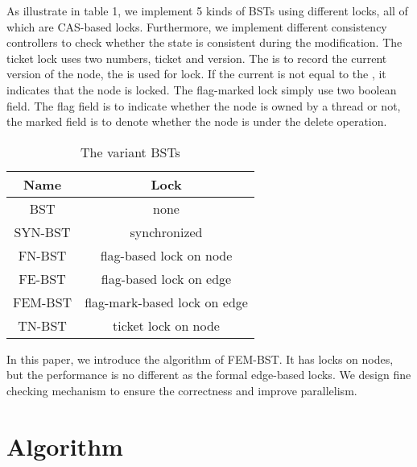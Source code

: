 \documentclass{article}
\begin{document}
As illustrate in table 1, we implement 5 kinds of BSTs using different locks, all of which are CAS-based locks. Furthermore, we implement different consistency controllers to check whether the state is consistent during the modification. The ticket lock uses two numbers, ticket and version. The  is to record the current version of the node, the  is used for lock. If the current  is not equal to the , it indicates that the node is locked. The flag-marked lock simply use two boolean field. The flag field is to indicate whether the node is owned by a thread or not, the marked field is to denote whether the node is under the delete operation.
\begin{table}[htbp]
\centering
\begin{tabular}{c|c}
\hline
Name & Lock \\
\hline
BST & none \\
SYN-BST & synchronized \\
FN-BST & flag-based lock on node \\
FE-BST & flag-based lock on edge \\
FEM-BST & flag-mark-based lock on edge \\
TN-BST & ticket lock on node \\
\hline
\end{tabular}
\caption{The variant BSTs}
\label{tab:my_label1}
\end{table}
In this paper, we introduce the algorithm of FEM-BST. It has locks on nodes, but the performance is no different as the formal edge-based locks. We design fine checking mechanism to ensure the correctness and improve parallelism. 

\section{Algorithm}
\end{document}
